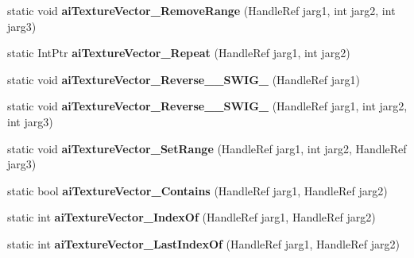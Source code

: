 \begin{DoxyCompactItemize}
\item 
\hypertarget{class_assimp_p_i_n_v_o_k_e_a70f26703aa1631ef6587e3bbc2788f01}{static void {\bfseries ai\+Texture\+Vector\+\_\+\+Remove\+Range} (Handle\+Ref jarg1, int jarg2, int jarg3)}\label{class_assimp_p_i_n_v_o_k_e_a70f26703aa1631ef6587e3bbc2788f01}

\item 
\hypertarget{class_assimp_p_i_n_v_o_k_e_aa8559963f825436e29a118373ac4d02c}{static Int\+Ptr {\bfseries ai\+Texture\+Vector\+\_\+\+Repeat} (Handle\+Ref jarg1, int jarg2)}\label{class_assimp_p_i_n_v_o_k_e_aa8559963f825436e29a118373ac4d02c}

\item 
\hypertarget{class_assimp_p_i_n_v_o_k_e_ad5b7b2ebdf610cdfdf6606733d324a5b}{static void {\bfseries ai\+Texture\+Vector\+\_\+\+Reverse\+\_\+\+\_\+\+S\+W\+I\+G\+\_} (Handle\+Ref jarg1)}\label{class_assimp_p_i_n_v_o_k_e_ad5b7b2ebdf610cdfdf6606733d324a5b}

\item 
\hypertarget{class_assimp_p_i_n_v_o_k_e_a71ad94a9ae2d960ba52328f8fd0aa480}{static void {\bfseries ai\+Texture\+Vector\+\_\+\+Reverse\+\_\+\+\_\+\+S\+W\+I\+G\+\_} (Handle\+Ref jarg1, int jarg2, int jarg3)}\label{class_assimp_p_i_n_v_o_k_e_a71ad94a9ae2d960ba52328f8fd0aa480}

\item 
\hypertarget{class_assimp_p_i_n_v_o_k_e_ad430ad59712e009c51c2efb2c8b35cf9}{static void {\bfseries ai\+Texture\+Vector\+\_\+\+Set\+Range} (Handle\+Ref jarg1, int jarg2, Handle\+Ref jarg3)}\label{class_assimp_p_i_n_v_o_k_e_ad430ad59712e009c51c2efb2c8b35cf9}

\item 
\hypertarget{class_assimp_p_i_n_v_o_k_e_ac97450a49ada6ba093628e657b06ef19}{static bool {\bfseries ai\+Texture\+Vector\+\_\+\+Contains} (Handle\+Ref jarg1, Handle\+Ref jarg2)}\label{class_assimp_p_i_n_v_o_k_e_ac97450a49ada6ba093628e657b06ef19}

\item 
\hypertarget{class_assimp_p_i_n_v_o_k_e_afa2e3f6b0ce7868027ab4b55d1c879ff}{static int {\bfseries ai\+Texture\+Vector\+\_\+\+Index\+Of} (Handle\+Ref jarg1, Handle\+Ref jarg2)}\label{class_assimp_p_i_n_v_o_k_e_afa2e3f6b0ce7868027ab4b55d1c879ff}

\item 
\hypertarget{class_assimp_p_i_n_v_o_k_e_a859608c3144d55b5cd50737ed6d19d0b}{static int {\bfseries ai\+Texture\+Vector\+\_\+\+Last\+Index\+Of} (Handle\+Ref jarg1, Handle\+Ref jarg2)}\label{class_assimp_p_i_n_v_o_k_e_a859608c3144d55b5cd50737ed6d19d0b}


\end{DoxyCompactItemize}
